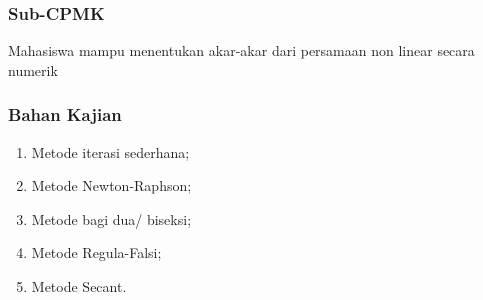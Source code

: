 \documentclass[pdflatex,compress]{beamer}
\begin{document}
\begin{frame}
	\frametitle{Sub-CPMK}
	Mahasiswa mampu menentukan akar-akar dari persamaan non linear secara numerik
\end{frame}

\begin{frame}
	\frametitle{Bahan Kajian}
	\begin{enumerate}
		\item Metode iterasi sederhana;
		\item Metode Newton-Raphson;
		\item Metode bagi dua/ biseksi;
		\item Metode Regula-Falsi;
		\item Metode Secant.
	\end{enumerate}
\end{frame}
\end{document}
